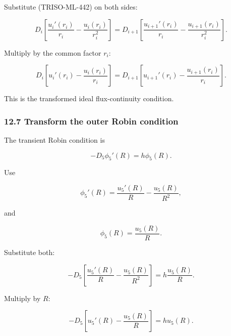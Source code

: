 \documentclass[11pt,a4paper]{article}
\begin{document}
Substitute (TRISO-ML-442) on both sides:

\begin{equation}
D_i
\left[
\frac{u_i'(r_i)}{r_i}
-
\frac{u_i(r_i)}{r_i^2}
\right]
=
D_{i+1}
\left[
\frac{u_{i+1}'(r_i)}{r_i}
-
\frac{u_{i+1}(r_i)}{r_i^2}
\right].
\tag{TRISO-ML-445}
\label{eq:triso-ml-445}
\end{equation}

Multiply by the common factor $r_i$:

\begin{equation}
\boxed{
D_i
\left[
u_i'(r_i)-\frac{u_i(r_i)}{r_i}
\right]
=
D_{i+1}
\left[
u_{i+1}'(r_i)-\frac{u_{i+1}(r_i)}{r_i}
\right].
}
\tag{TRISO-ML-446}
\label{eq:triso-ml-446}
\end{equation}

This is the transformed ideal flux-continuity condition.

\subsubsection*{12.7 Transform the outer Robin condition}

The transient Robin condition is

\begin{equation}
-D_5\phi_5'(R)=h\phi_5(R).
\tag{TRISO-ML-447}
\label{eq:triso-ml-447}
\end{equation}

Use

\begin{equation}
\phi_5'(R)
=
\frac{u_5'(R)}{R}
-
\frac{u_5(R)}{R^2},
\tag{TRISO-ML-448}
\label{eq:triso-ml-448}
\end{equation}

and

\begin{equation}
\phi_5(R)=\frac{u_5(R)}{R}.
\tag{TRISO-ML-449}
\label{eq:triso-ml-449}
\end{equation}

Substitute both:

\begin{equation}
-D_5
\left[
\frac{u_5'(R)}{R}
-
\frac{u_5(R)}{R^2}
\right]
=
h\frac{u_5(R)}{R}.
\tag{TRISO-ML-450}
\label{eq:triso-ml-450}
\end{equation}

Multiply by $R$:

\begin{equation}
\boxed{
-D_5
\left[
u_5'(R)-\frac{u_5(R)}{R}
\right]
=
hu_5(R).
}
\tag{TRISO-ML-451}
\label{eq:triso-ml-451}
\end{equation}
\end{document}
